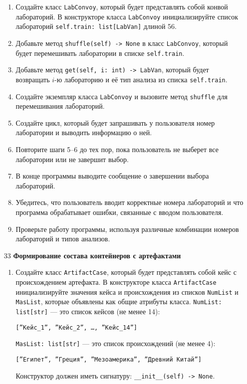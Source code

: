 \begin{enumerate}
\begin{enumerate}
    \item Создайте класс \texttt{LabConvoy}, который будет представлять собой конвой лабораторий. В конструкторе класса \texttt{LabConvoy} инициализируйте список лабораторий \texttt{self.train: list[LabVan]} длиной 56.

    \item Добавьте метод \texttt{shuffle(self) -> None} в класс \texttt{LabConvoy}, который будет перемешивать лаборатории в списке \texttt{self.train}.

    \item Добавьте метод \texttt{get(self, i: int) -> LabVan}, который будет возвращать $i$-ю лабораторию и её тип анализа из списка \texttt{self.train}.

    \item Создайте экземпляр класса \texttt{LabConvoy} и вызовите метод \texttt{shuffle} для перемешивания лабораторий.

    \item Создайте цикл, который будет запрашивать у пользователя номер лаборатории и выводить информацию о ней.

    \item Повторите шаги 5–6 до тех пор, пока пользователь не выберет все лаборатории или не завершит выбор.

    \item В конце программы выводите сообщение о завершении выбора лабораторий.

    \item Убедитесь, что пользователь вводит корректные номера лабораторий и что программа обрабатывает ошибки, связанные с вводом пользователя.

    \item Проверьте работу программы, используя различные комбинации номеров лабораторий и типов анализов.
\end{enumerate}

\item[33] \textbf{Формирование состава контейнеров с артефактами}
\begin{enumerate}
    \item Создайте класс \texttt{ArtifactCase}, который будет представлять собой кейс с происхождением артефакта. В конструкторе класса \texttt{ArtifactCase} инициализируйте значения кейса и происхождения из списков \texttt{NumList} и \texttt{MasList}, которые объявлены как общие атрибуты класса. \texttt{NumList: list[str]} — это список кейсов (не менее 14): 
    \begin{center}
        \texttt{[''Кейс\_1'', ''Кейс\_2'', \dots, ''Кейс\_14'']}
    \end{center}
    \texttt{MasList: list[str]} — это список происхождений (не менее 4):
    \begin{center}
        \texttt{[''Египет'', ''Греция'', ''Мезоамерика'', ''Древний Китай'']}
    \end{center}
    Конструктор должен иметь сигнатуру: \texttt{\_\_init\_\_(self) -> None}.


\end{enumerate}
\end{enumerate}
